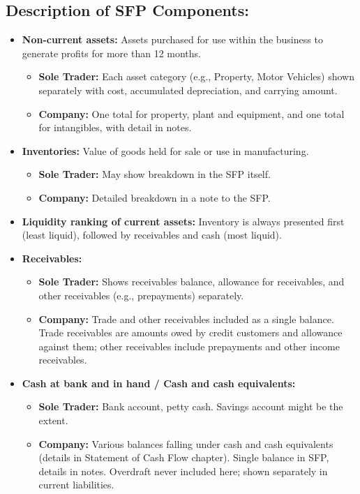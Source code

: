 \subsection*{Description of SFP Components:}
\begin{itemize}
    \item \textbf{Non-current assets:} Assets purchased for use within the business to generate profits for more than 12 months.
    \begin{itemize}
        \item \textbf{Sole Trader:} Each asset category (e.g., Property, Motor Vehicles) shown separately with cost, accumulated depreciation, and carrying amount.
        \item \textbf{Company:} One total for property, plant and equipment, and one total for intangibles, with detail in notes.
    \end{itemize}
    \item \textbf{Inventories:} Value of goods held for sale or use in manufacturing.
    \begin{itemize}
        \item \textbf{Sole Trader:} May show breakdown in the SFP itself.
        \item \textbf{Company:} Detailed breakdown in a note to the SFP.
    \end{itemize}
    \item \textbf{Liquidity ranking of current assets:} Inventory is always presented first (least liquid), followed by receivables and cash (most liquid).
    \item \textbf{Receivables:}
    \begin{itemize}
        \item \textbf{Sole Trader:} Shows receivables balance, allowance for receivables, and other receivables (e.g., prepayments) separately.
        \item \textbf{Company:} Trade and other receivables included as a single balance. Trade receivables are amounts owed by credit customers and allowance against them; other receivables include prepayments and other income receivables.
    \end{itemize}
    \item \textbf{Cash at bank and in hand / Cash and cash equivalents:}
    \begin{itemize}
        \item \textbf{Sole Trader:} Bank account, petty cash. Savings account might be the extent.
        \item \textbf{Company:} Various balances falling under cash and cash equivalents (details in Statement of Cash Flow chapter). Single balance in SFP, details in notes. Overdraft never included here; shown separately in current liabilities.

\end{itemize}
\end{itemize}

